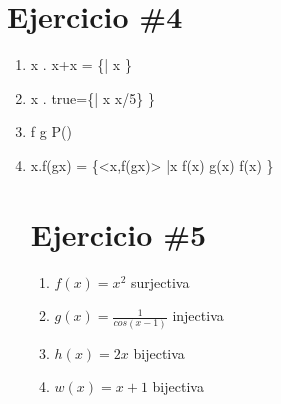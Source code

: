 \documentclass{article}
\begin{document}
\section{Ejercicio \#4}
\begin{enumerate}
\item{\lambda x \in {} . x+x = \{<x,x+x>| x \in {}}\}

 \item{\lambda x \in {} . true=\{<x,true>| x \in {} \wedge x/5}\} \} 
 
\item{f \circ g \in P()} 

\item{\lambda x\in{}.f(gx) = \{<x,f(gx)> |x \in {}\wedge f(x)\in{} \wedge g(x) \subset f(x) }\} 

\section*{Ejercicio \#5}
\begin{enumerate}

\item{$f(x)=x^2$} surjectiva 
\item{$g(x)=\frac{1}{cos(x-1)}$} injectiva
\item{$h(x)=2x$} bijectiva
\item{$w(x)=x+1$} bijectiva

\end{enumerate}
        

\end{enumerate}
\end{document}
